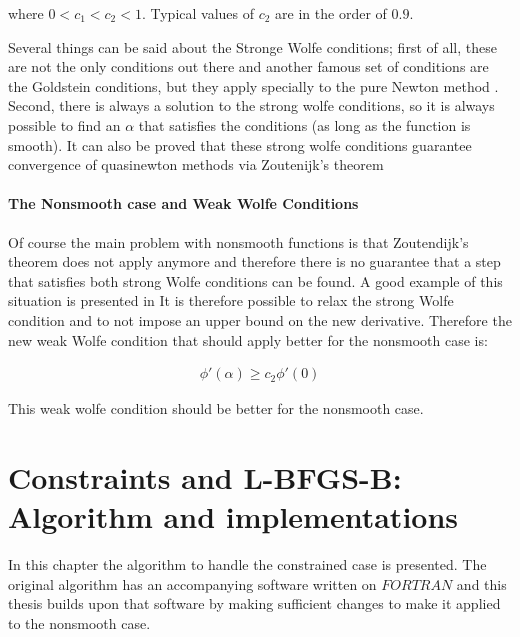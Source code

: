 where $0 < c_1 < c_2 < 1$.  Typical values of $c_2$ are in the order of $0.9$.

Several things can be said about the Stronge Wolfe conditions; first of all, these are not the only conditions out there and another famous set of conditions are the Goldstein conditions, but they apply specially to the pure Newton method \citep{nocedal}.  Second, there is always a solution to the strong wolfe conditions, so it is always possible to find an $\alpha$ that satisfies the conditions (as long as the function is smooth).  It can also be proved that these strong wolfe conditions guarantee convergence of quasinewton methods via Zoutenijk's theorem \citep{zoutendijk}

\subsubsection{The Nonsmooth case and Weak Wolfe Conditions}

Of course the main problem with nonsmooth functions is that Zoutendijk's theorem does not apply anymore and therefore there is no guarantee that a step that satisfies both strong Wolfe conditions can be found.  A good example of this situation is presented in \citep{skaaja}  It is therefore possible to relax the strong Wolfe condition and to not impose an upper bound on the new derivative.  Therefore the new weak Wolfe condition that should apply better for the nonsmooth case is: 

\begin{equation} \label{weakWolfe}
  \begin{aligned}
    \phi'(\alpha) \geq c_2\phi'(0)
  \end{aligned}
\end{equation}

This weak wolfe condition should be better for the nonsmooth case.

\chapter{Constraints and L-BFGS-B: Algorithm and implementations}
\label{ChapterConstraints} %

In this chapter the algorithm to handle the constrained case is presented.  The original algorithm \citep{mainpaper} has an accompanying software written on $FORTRAN$ and this thesis builds upon that software by making sufficient changes to make it applied to the nonsmooth case.

